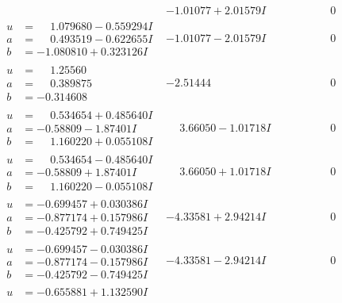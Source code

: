 \documentclass[1p]{elsarticle_modified}
\theoremstyle{definition}
\begin{document}
$$\begin{array}{c|c|c}
 & -1.01077 + 2.01579 I & \phantom{-0.000000 } 0 \\ \hline\begin{aligned}
u &= \phantom{-}1.079680 - 0.559294 I \\
a &= \phantom{-}0.493519 - 0.622655 I \\
b &= -1.080810 + 0.323126 I\end{aligned}
 & -1.01077 - 2.01579 I & \phantom{-0.000000 } 0 \\ \hline\begin{aligned}
u &= \phantom{-}1.25560\phantom{ +0.000000I} \\
a &= \phantom{-}0.389875\phantom{ +0.000000I} \\
b &= -0.314608\phantom{ +0.000000I}\end{aligned}
 & -2.51444\phantom{ +0.000000I} & \phantom{-0.000000 } 0 \\ \hline\begin{aligned}
u &= \phantom{-}0.534654 + 0.485640 I \\
a &= -0.58809 - 1.87401 I \\
b &= \phantom{-}1.160220 + 0.055108 I\end{aligned}
 & \phantom{-}3.66050 - 1.01718 I & \phantom{-0.000000 } 0 \\ \hline\begin{aligned}
u &= \phantom{-}0.534654 - 0.485640 I \\
a &= -0.58809 + 1.87401 I \\
b &= \phantom{-}1.160220 - 0.055108 I\end{aligned}
 & \phantom{-}3.66050 + 1.01718 I & \phantom{-0.000000 } 0 \\ \hline\begin{aligned}
u &= -0.699457 + 0.030386 I \\
a &= -0.877174 + 0.157986 I \\
b &= -0.425792 + 0.749425 I\end{aligned}
 & -4.33581 + 2.94214 I & \phantom{-0.000000 } 0 \\ \hline\begin{aligned}
u &= -0.699457 - 0.030386 I \\
a &= -0.877174 - 0.157986 I \\
b &= -0.425792 - 0.749425 I\end{aligned}
 & -4.33581 - 2.94214 I & \phantom{-0.000000 } 0 \\ \hline\begin{aligned}
u &= -0.655881 + 1.132590 I \\

\end{aligned}
\end{array}$$
\end{document}
